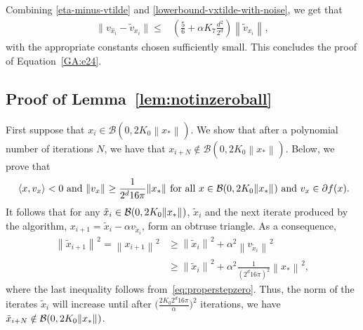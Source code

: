 \documentclass[11pt]{article}
\newcommand{\xo}{x_\ast}
\newcommand{\Tnorm}{}
\newcommand\norm[2][\Tnorm]{\ensuremath{{\left\|#2\right\|}_{#1}}}
\newcommand\Tinnerprod{}
\newcommand{\innerprod}[3][\Tinnerprod]{\ifthenelse{\equal{#1}{}}{\ensuremath{\left<#2,#3\right>}}{\ensuremath{\left<#2,#3\right>_{#1}}}}
\newcommand\setS{\mathcal S}
\newcommand\stepdir[1]{\tilde v_{#1}}
\newcommand\ball{\mathcal B}
\newcommand{\whcomm}[2]{{\color{black} #1}{\color{black} #2}} %
\begin{document}
Combining \eqref{eta-minus-vtilde} and \eqref{lowerbound-vxtilde-with-noise}, we get that
\begin{align*}
\|v_{\hat{x}_{i}} - \tilde{v}_{x_{i}}\|
\leq&
\left(
\frac{5}{6}  + \alpha K_7 \frac{d^2}{2^d}
\right)
\norm{ \stepdir{x_i} },
\end{align*}
with the appropriate constants chosen sufficiently small.
This concludes the proof of Equation~\eqref{GA:e24}.






\subsection{Proof of Lemma~\ref{lem:notinzeroball}}
First suppose that $x_i \in \ball(0,2K_0 \norm{\xo})$.
We show that after a polynomial number of iterations $N$, we have that $x_{i+N} \notin \ball(0,2K_0 \norm{\xo})$.
Below, we prove that
\begin{align}
\label{eq:properstepzero}
\text{
$\innerprod{x}{\whcomm{}{v_{x}}} < 0$
and
$\whcomm{}{\norm{ v_x }} \geq \frac{1}{2^d 16\pi} \norm{\xo}$
for all
$x \in \mathcal{B}(0, 2K_0 \norm{\xo})$ \whcomm{}{and $v_x \in \partial f(x)$}}.
\end{align}
It follows that for any
$\whcomm{}{\tilde{x}_i} \in \ball(0, 2K_0 \norm{\xo})$,
\whcomm{}{$\tilde{x}_i$} and the next iterate produced by the algorithm,
\whcomm{}{$x_{i+1} = \tilde{x}_i - \alpha v_{\tilde{x}_i}$}, form an obtruse triangle.
As a consequence,
\whcomm{}{
\begin{align*}
\norm{\tilde{x}_{i + 1}}^2 = \norm{x_{i + 1}}^2
&\geq
\norm{\tilde{x}_i}^2 + \alpha^2 \norm{v_{\tilde{x}_i}}^2 \\
&\geq
\norm{\tilde{x}_i}^2 + \alpha^2 \frac{1}{(2^{d} 16\pi)^2} \norm{\xo}^2,
\end{align*}
}
where the last inequality follows from~\eqref{eq:properstepzero}.
Thus, the norm of the iterates \whcomm{}{$\tilde{x}_i$} will increase until after $\bigl(\frac{2 K_0 2^d 16 \pi}{\alpha} \bigr)^2$  iterations, we have $\whcomm{}{\tilde{x}_{i+N}} \notin \ball(0, 2K_0 \norm{\xo})$.
\end{document}

